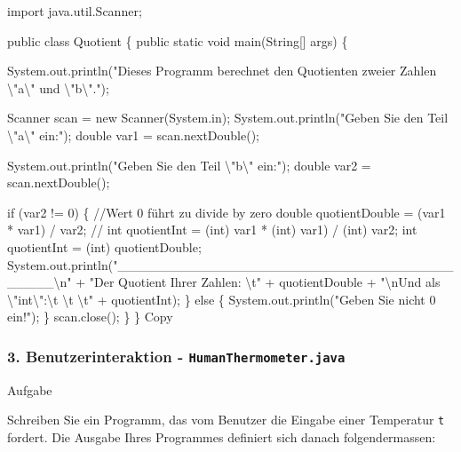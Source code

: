 \documentclass[
]{article}
\newenvironment{Shaded}{}{}
\newcommand{\NormalTok}[1]{#1}
\begin{document}
\begin{Shaded}
\begin{Highlighting}[]
\NormalTok{import java.util.Scanner;}

\NormalTok{public class Quotient \{}
\NormalTok{    public static void main(String[] args) \{}

\NormalTok{        System.out.println("Dieses Programm berechnet den Quotienten zweier Zahlen \textbackslash{}"a\textbackslash{}" und \textbackslash{}"b\textbackslash{}".");}
        
\NormalTok{        Scanner scan = new Scanner(System.in);}
\NormalTok{        System.out.println("Geben Sie den Teil \textbackslash{}"a\textbackslash{}" ein:");}
\NormalTok{        double var1 = scan.nextDouble();}
        
\NormalTok{        System.out.println("Geben Sie den Teil \textbackslash{}"b\textbackslash{}" ein:");}
\NormalTok{        double var2 = scan.nextDouble();}
        
\NormalTok{        if (var2 != 0) \{ //Wert 0 führt zu divide by zero}
\NormalTok{            double quotientDouble = (var1 * var1) / var2;}
\NormalTok{            // int quotientInt = (int) var1 * (int) var1) / (int) var2;}
\NormalTok{            int quotientInt = (int) quotientDouble;}
\NormalTok{            System.out.println("\_\_\_\_\_\_\_\_\_\_\_\_\_\_\_\_\_\_\_\_\_\_\_\_\_\_\_\_\_\_\_\_\_\_\_\_\_\_\_\_\_\textbackslash{}n" + }
\NormalTok{                "Der Quotient Ihrer Zahlen: \textbackslash{}t" + quotientDouble + }
\NormalTok{                "\textbackslash{}nUnd als \textbackslash{}"int\textbackslash{}":\textbackslash{}t \textbackslash{}t \textbackslash{}t" + quotientInt);}
\NormalTok{        \} else \{ }
\NormalTok{            System.out.println("Geben Sie nicht 0 ein!");}
\NormalTok{        \}}
\NormalTok{        scan.close();}
\NormalTok{    \}}
\NormalTok{\}}
\NormalTok{Copy}
\end{Highlighting}
\end{Shaded}

\subsubsection{\texorpdfstring{3. Benutzerinteraktion -
\texttt{HumanThermometer.java}}{3. Benutzerinteraktion - HumanThermometer.java}}\label{benutzerinteraktion---humanthermometer.java}

Aufgabe

Schreiben Sie ein Programm, das vom Benutzer die Eingabe einer
Temperatur \texttt{t} fordert. Die Ausgabe Ihres Programmes definiert
sich danach folgendermassen:
\end{document}
